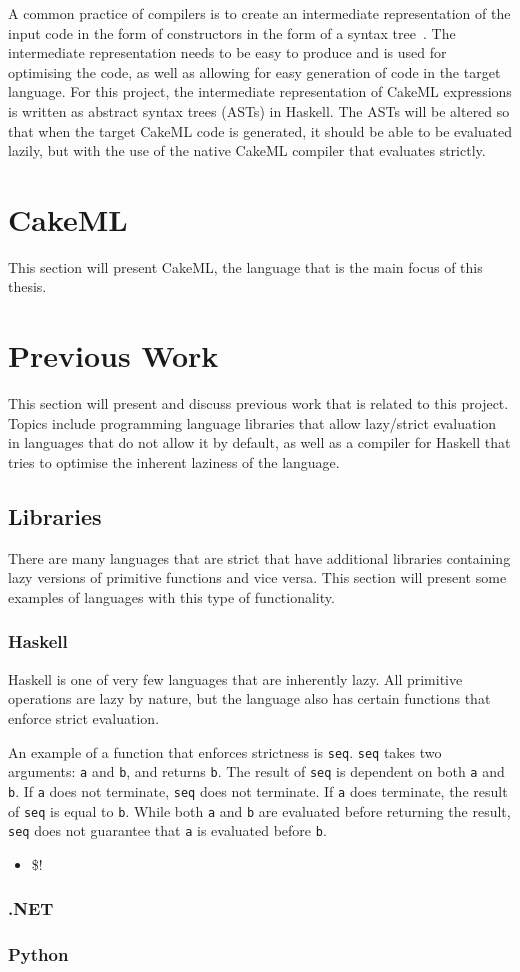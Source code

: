A common practice of compilers is to create an intermediate representation of
the input code in the form of constructors in the form of a syntax
tree~\cite{DragonBook}. The intermediate representation needs to be
easy to produce and is used for optimising the code, as well as allowing for
easy generation of code in the target language.
For this project, the intermediate representation of CakeML expressions is %
written as abstract syntax trees (ASTs) in Haskell. The ASTs will be altered so
that when the target CakeML code is generated, it should be able to be evaluated
lazily, but with the use of the native CakeML compiler that evaluates strictly.

\section{CakeML}
\label{back:cakeml}
This section will present CakeML, the language that is the main focus of this
thesis.

\section{Previous Work}
This section will present and discuss previous work that is related to this
project. Topics include programming language libraries that allow lazy/strict
evaluation in languages that do not allow it by default, as well as a compiler
for Haskell that tries to optimise the inherent laziness of the language.

\subsection{Libraries}
There are many languages that are strict that have additional libraries
containing lazy versions of primitive functions and vice versa. This section
will present some examples of languages with this type of functionality.

\subsubsection{Haskell}
Haskell is one of very few languages that are inherently lazy. All primitive
operations are lazy by nature, but the language also has certain functions that
enforce strict evaluation.

An example of a function that enforces strictness is \texttt{seq}. \texttt{seq}
takes two arguments: \texttt{a} and \texttt{b}, and returns \texttt{b}. The
result of \texttt{seq} is dependent on both \texttt{a} and \texttt{b}. If
\texttt{a} does not terminate, \texttt{seq} does not terminate. If \texttt{a}
does terminate, the result of \texttt{seq} is equal to \texttt{b}. While both
\texttt{a} and \texttt{b} are evaluated before returning the result,
\texttt{seq} does not guarantee that \texttt{a} is evaluated before \texttt{b}.

\begin{itemize}
\item \$!
\end{itemize}

\subsubsection{.NET}

\subsubsection{Python}
